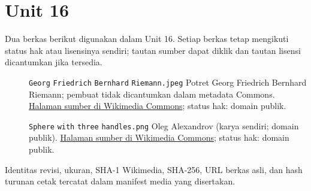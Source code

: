 \section*{Unit 16}
Dua berkas berikut digunakan dalam Unit 16. Setiap berkas tetap mengikuti status hak atau lisensinya sendiri; tautan sumber dapat diklik dan tautan lisensi dicantumkan jika tersedia.
\begin{description}
\item[]\texttt{Georg} \texttt{Friedrich} \texttt{Bernhard} \texttt{Riemann.jpeg}
Potret Georg Friedrich Bernhard Riemann; pembuat tidak dicantumkan dalam metadata Commons.
\href{https://commons.wikimedia.org/wiki/File:Georg_Friedrich_Bernhard_Riemann.jpeg}{Halaman sumber di Wikimedia Commons}; status hak: domain publik.
\item[]\texttt{Sphere} \texttt{with} \texttt{three} \texttt{handles.png}
Oleg Alexandrov (karya sendiri; domain publik).
\href{https://commons.wikimedia.org/wiki/File:Sphere_with_three_handles.png}{Halaman sumber di Wikimedia Commons}; status hak: domain publik.
\end{description}
Identitas revisi, ukuran, SHA-1 Wikimedia, SHA-256, URL berkas asli, dan hash turunan cetak tercatat dalam manifest media yang disertakan.
